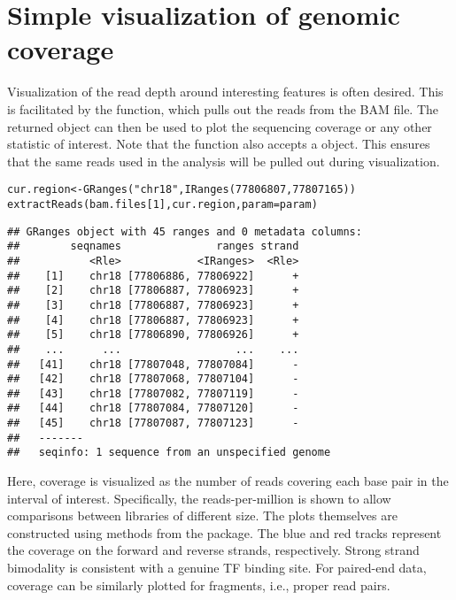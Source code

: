 \documentclass{report}\usepackage[]{graphicx}\usepackage[usenames,dvipsnames]{color}
\newcommand{\hlnum}[1]{\textcolor[rgb]{0.816,0.125,0.439}{#1}}%
\newcommand{\hlstr}[1]{\textcolor[rgb]{0.251,0.627,0.251}{#1}}%
\newcommand{\hlstd}[1]{\textcolor[rgb]{0.251,0.251,0.251}{#1}}%
\newcommand{\hlkwb}[1]{\textcolor[rgb]{0,0,0}{#1}}%
\newcommand{\hlkwc}[1]{\textcolor[rgb]{0.251,0.251,0.251}{#1}}%
\newcommand{\hlkwd}[1]{\textcolor[rgb]{0.878,0.439,0.125}{#1}}%
\newenvironment{knitrout}{}{} %
\begin{document}
\section{Simple visualization of genomic coverage}
Visualization of the read depth around interesting features is often desired.
This is facilitated by the  function, which pulls out the reads from the BAM file.
The returned  object can then be used to plot the sequencing coverage or any other statistic of interest.
Note that the  function also accepts a  object.
This ensures that the same reads used in the analysis will be pulled out during visualization.

\begin{knitrout}
\color{fgcolor}\begin{kframe}
\begin{alltt}
\hlstd{cur.region} \hlkwb{<-} \hlkwd{GRanges}\hlstd{(}\hlstr{"chr18"}\hlstd{,} \hlkwd{IRanges}\hlstd{(}\hlnum{77806807}\hlstd{,} \hlnum{77807165}\hlstd{))}
\hlkwd{extractReads}\hlstd{(bam.files[}\hlnum{1}\hlstd{], cur.region,} \hlkwc{param}\hlstd{=param)}
\end{alltt}
\begin{verbatim}
## GRanges object with 45 ranges and 0 metadata columns:
##        seqnames               ranges strand
##           <Rle>            <IRanges>  <Rle>
##    [1]    chr18 [77806886, 77806922]      +
##    [2]    chr18 [77806887, 77806923]      +
##    [3]    chr18 [77806887, 77806923]      +
##    [4]    chr18 [77806887, 77806923]      +
##    [5]    chr18 [77806890, 77806926]      +
##    ...      ...                  ...    ...
##   [41]    chr18 [77807048, 77807084]      -
##   [42]    chr18 [77807068, 77807104]      -
##   [43]    chr18 [77807082, 77807119]      -
##   [44]    chr18 [77807084, 77807120]      -
##   [45]    chr18 [77807087, 77807123]      -
##   -------
##   seqinfo: 1 sequence from an unspecified genome
\end{verbatim}
\end{kframe}
\end{knitrout}

Here, coverage is visualized as the number of reads covering each base pair in the interval of interest.
Specifically, the reads-per-million is shown to allow comparisons between libraries of different size.
The plots themselves are constructed using methods from the  package.
The blue and red tracks represent the coverage on the forward and reverse strands, respectively. 
Strong strand bimodality is consistent with a genuine TF binding site.
For paired-end data, coverage can be similarly plotted for fragments, i.e., proper read pairs.
\end{document}
